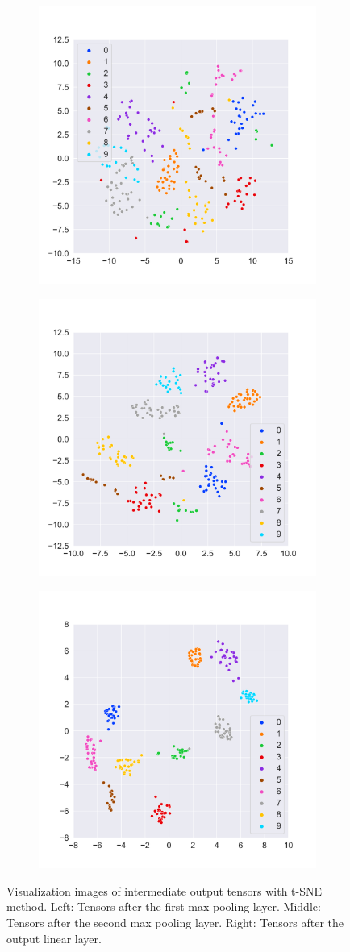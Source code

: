 \begin{figure}[htbp]
    \centering
    \begin{subfigure}
        \centering
        \includegraphics[width=0.32\linewidth]{../images/mnist_feature_map1_tsne.png}
        \label{fig:mnist_tSNE_1}
    \end{subfigure}
    \begin{subfigure}
        \centering
        \includegraphics[width=0.32\linewidth]{../images/mnist_feature_map2_tsne.png}
        \label{fig:mnist_tSNE_2}
    \end{subfigure}
    \begin{subfigure}
        \centering
        \includegraphics[width=0.32\linewidth]{../images/mnist_feature_map3_tsne.png}
        \label{fig:mnist_tSNE_3}
    \end{subfigure}
    \caption{Visualization images of intermediate output tensors with t-SNE method. Left: Tensors after the first max pooling layer. Middle: Tensors after the second max pooling layer. Right: Tensors after the output linear layer.}
    \label{fig:mnist_tsne}
\end{figure}
